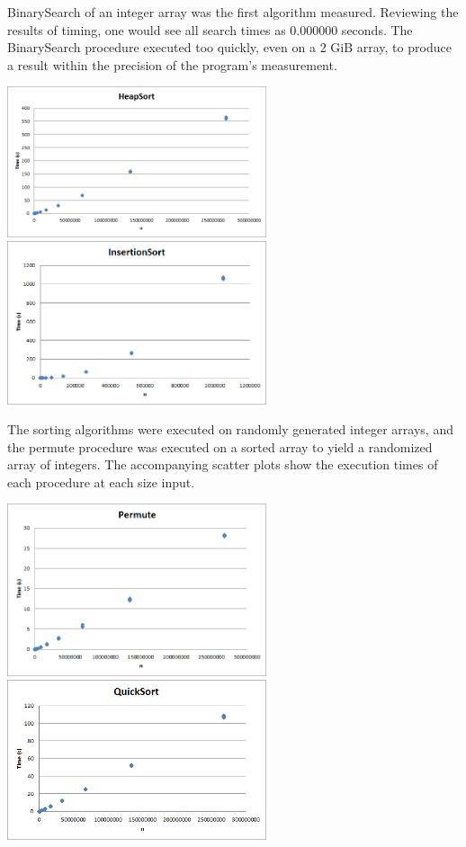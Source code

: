     BinarySearch of an integer array was the first algorithm measured.
    Reviewing the results of timing, one would see all search times as 0.000000
    seconds. The BinarySearch procedure executed too quickly, even on a 2 GiB
    array, to produce a result within the precision of the program's
    measurement.
   \begin{center}
    \includegraphics[width=3in]{heapsort.png}
    \includegraphics[width=3in]{insertionsort.png}
   \end{center}
    
    The sorting algorithms were executed on randomly generated integer arrays,
    and the permute procedure was executed on a sorted array to yield a
    randomized array of integers. The accompanying scatter plots show the
    execution times of each procedure at each size input.
    
   \begin{center}
    \includegraphics[width=3in]{permute.png}
    \includegraphics[width=3in]{quicksort.png}
   \end{center}